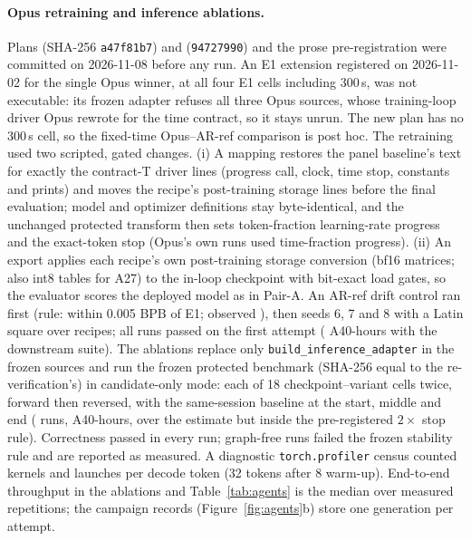 \documentclass{article}
\begin{document}
\paragraph{Opus retraining and inference ablations.} Plans  (SHA-256 \texttt{a47f81b7}) and  (\texttt{94727990}) and the prose pre-registration  were committed on 2026-11-08 before any run. An E1 extension registered on 2026-11-02 for the single Opus winner, at all four E1 cells including 300\,s, was not executable: its frozen adapter refuses all three Opus sources, whose training-loop driver Opus rewrote for the time contract, so it stays unrun. The new plan has no 300\,s cell, so the fixed-time Opus--AR-ref comparison is post hoc. The retraining used two scripted, gated changes. (i) A mapping restores the panel baseline's text for exactly the contract-T driver lines (progress call, clock, time stop, constants and prints) and moves the recipe's post-training storage lines before the final evaluation; model and optimizer definitions stay byte-identical, and the unchanged protected transform then sets token-fraction learning-rate progress and the exact-token stop (Opus's own runs used time-fraction progress). (ii) An export applies each recipe's own post-training storage conversion (bf16 matrices; also int8 tables for A27) to the in-loop checkpoint with bit-exact load gates, so the evaluator scores the deployed model as in Pair-A. An AR-ref drift control ran first (rule: within 0.005 BPB of E1; observed \CRMTDriftAbs), then seeds 6, 7 and 8 with a Latin square over recipes; all \CRMTRuns{} runs passed on the first attempt (\CRMTHours{} A40-hours with the downstream suite). The ablations replace only \texttt{build\_inference\_adapter} in the frozen sources and run the frozen protected benchmark (SHA-256 equal to the re-verification's) in candidate-only mode: each of 18 checkpoint--variant cells twice, forward then reversed, with the same-session baseline at the start, middle and end (\CRIARuns{} runs, \CRIAHours{} A40-hours, over the estimate but inside the pre-registered $2\times$ stop rule). Correctness passed in every run; \CRIAUnstable{} graph-free runs failed the frozen stability rule and are reported as measured. A diagnostic \texttt{torch.profiler} census counted kernels and launches per decode token (32 tokens after 8 warm-up). End-to-end throughput in the ablations and Table~\ref{tab:agents} is the median over measured repetitions; the campaign records (Figure~\ref{fig:agents}b) store one generation per attempt.
\end{document}
